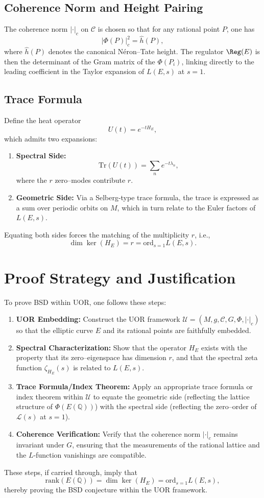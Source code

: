 \documentclass[11pt]{article}
\begin{document}
\subsection{Coherence Norm and Height Pairing}
The coherence norm $|\cdot|_c$ on $\mathcal{C}$ is chosen so that for any rational point $P$, one has
\[
|\Phi(P)|_c^2 = \hat{h}(P),
\]
where $\hat{h}(P)$ denotes the canonical Néron--Tate height. The regulator $\Reg(E)$ is then the determinant of the Gram matrix of the $\Phi(P_i)$, linking directly to the leading coefficient in the Taylor expansion of $L(E,s)$ at $s=1$.

\subsection{Trace Formula}
Define the heat operator 
\[
U(t)=e^{-tH_E},
\]
which admits two expansions:
\begin{enumerate}[label=(\alph*)]
  \item \textbf{Spectral Side:} 
  \[
  \mathrm{Tr}(U(t))=\sum_{n} e^{-t \lambda_n},
  \]
  where the $r$ zero--modes contribute $r$.
  \item \textbf{Geometric Side:} Via a Selberg-type trace formula, the trace is expressed as a sum over periodic orbits on $M$, which in turn relate to the Euler factors of $L(E,s)$.
\end{enumerate}
Equating both sides forces the matching of the multiplicity $r$, i.e., 
\[
\dim\ker(H_E)=r = \mathrm{ord}_{s=1}L(E,s).
\]

\section{Proof Strategy and Justification}

To prove BSD within UOR, one follows these steps:
\begin{enumerate}[label=(\arabic*)]
  \item \textbf{UOR Embedding:} Construct the UOR framework $\mathcal{U}=(M,g,\mathcal{C},G,\Phi,|\cdot|_c)$ so that the elliptic curve $E$ and its rational points are faithfully embedded.
  \item \textbf{Spectral Characterization:} Show that the operator $H_E$ exists with the property that its zero--eigenspace has dimension $r$, and that the spectral zeta function $\zeta_{H_E}(s)$ is related to $L(E,s)$.
  \item \textbf{Trace Formula/Index Theorem:} Apply an appropriate trace formula or index theorem within $\mathcal{U}$ to equate the geometric side (reflecting the lattice structure of $\Phi(E(\mathbb{Q}))$) with the spectral side (reflecting the zero--order of $\mathcal{L}(s)$ at $s=1$).
  \item \textbf{Coherence Verification:} Verify that the coherence norm $|\cdot|_c$ remains invariant under $G$, ensuring that the measurements of the rational lattice and the $L$-function vanishings are compatible.
\end{enumerate}
These steps, if carried through, imply that 
\[
\mathrm{rank}(E(\mathbb{Q})) = \dim\ker(H_E)= \mathrm{ord}_{s=1}L(E,s),
\]
thereby proving the BSD conjecture within the UOR framework.
\end{document}
